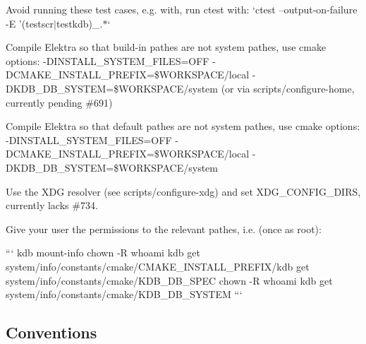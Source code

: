 \begin{DoxyEnumerate}
\item Avoid running these test cases, e.\+g. with, run ctest with\+: `ctest --output-\/on-\/failure -\/\+E '(testscr$\vert$testkdb)\+\_\+.$\ast$`
\item Compile Elektra so that build-\/in pathes are not system pathes, use cmake options\+: {\ttfamily -\/\+D\+I\+N\+S\+T\+A\+L\+L\+\_\+\+S\+Y\+S\+T\+E\+M\+\_\+\+F\+I\+L\+E\+S=O\+F\+F -\/\+D\+C\+M\+A\+K\+E\+\_\+\+I\+N\+S\+T\+A\+L\+L\+\_\+\+P\+R\+E\+F\+I\+X=\$\+W\+O\+R\+K\+S\+P\+A\+C\+E/local -\/\+D\+K\+D\+B\+\_\+\+D\+B\+\_\+\+S\+Y\+S\+T\+E\+M=\$\+W\+O\+R\+K\+S\+P\+A\+C\+E/system} (or via {\ttfamily scripts/configure-\/home}, currently pending \#691)
\item Compile Elektra so that default pathes are not system pathes, use cmake options\+: {\ttfamily -\/\+D\+I\+N\+S\+T\+A\+L\+L\+\_\+\+S\+Y\+S\+T\+E\+M\+\_\+\+F\+I\+L\+E\+S=O\+F\+F -\/\+D\+C\+M\+A\+K\+E\+\_\+\+I\+N\+S\+T\+A\+L\+L\+\_\+\+P\+R\+E\+F\+I\+X=\$\+W\+O\+R\+K\+S\+P\+A\+C\+E/local -\/\+D\+K\+D\+B\+\_\+\+D\+B\+\_\+\+S\+Y\+S\+T\+E\+M=\$\+W\+O\+R\+K\+S\+P\+A\+C\+E/system}
\item Use the X\+D\+G resolver (see {\ttfamily scripts/configure-\/xdg}) and set {\ttfamily X\+D\+G\+\_\+\+C\+O\+N\+F\+I\+G\+\_\+\+D\+I\+R\+S}, currently lacks \#734.
\item Give your user the permissions to the relevant pathes, i.\+e. (once as root)\+:

``` kdb mount-\/info chown -\/\+R {\ttfamily whoami} {\ttfamily kdb get system/info/constants/cmake/\+C\+M\+A\+K\+E\+\_\+\+I\+N\+S\+T\+A\+L\+L\+\_\+\+P\+R\+E\+F\+I\+X}/{\ttfamily kdb get system/info/constants/cmake/\+K\+D\+B\+\_\+\+D\+B\+\_\+\+S\+P\+E\+C} chown -\/\+R {\ttfamily whoami} {\ttfamily kdb get system/info/constants/cmake/\+K\+D\+B\+\_\+\+D\+B\+\_\+\+S\+Y\+S\+T\+E\+M} ```
\end{DoxyEnumerate}

\subsection*{Conventions}


